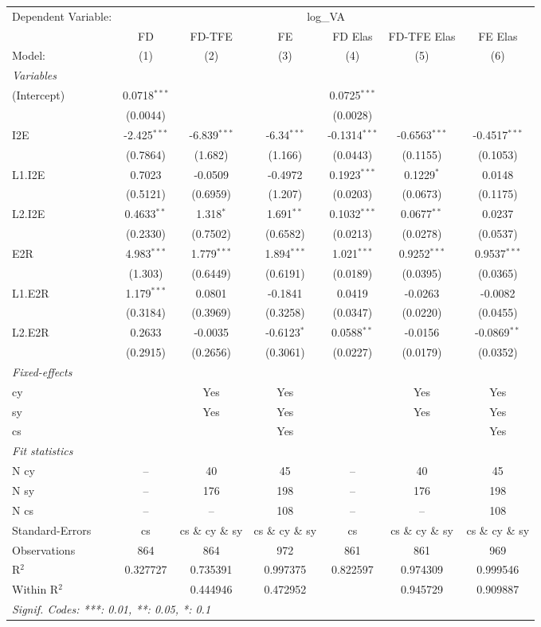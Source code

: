 \begin{tabular}{lcccccc}
Dependent Variable:&\multicolumn{6}{c}{log\_VA}\\
  & FD & FD-TFE & FE & FD Elas & FD-TFE Elas & FE Elas\\
Model:&(1) & (2) & (3) & (4) & (5) & (6)\\
\midrule \emph{Variables}&   &   &   &   &   &  \\
(Intercept)&0.0718$^{***}$ &    &    & 0.0725$^{***}$ &    &   \\
  &(0.0044) &    &    & (0.0028) &    &   \\
I2E&-2.425$^{***}$ & -6.839$^{***}$ & -6.34$^{***}$ & -0.1314$^{***}$ & -0.6563$^{***}$ & -0.4517$^{***}$\\
  &(0.7864) & (1.682) & (1.166) & (0.0443) & (0.1155) & (0.1053)\\
L1.I2E&0.7023 & -0.0509 & -0.4972 & 0.1923$^{***}$ & 0.1229$^{*}$ & 0.0148\\
  &(0.5121) & (0.6959) & (1.207) & (0.0203) & (0.0673) & (0.1175)\\
L2.I2E&0.4633$^{**}$ & 1.318$^{*}$ & 1.691$^{**}$ & 0.1032$^{***}$ & 0.0677$^{**}$ & 0.0237\\
  &(0.2330) & (0.7502) & (0.6582) & (0.0213) & (0.0278) & (0.0537)\\
E2R&4.983$^{***}$ & 1.779$^{***}$ & 1.894$^{***}$ & 1.021$^{***}$ & 0.9252$^{***}$ & 0.9537$^{***}$\\
  &(1.303) & (0.6449) & (0.6191) & (0.0189) & (0.0395) & (0.0365)\\
L1.E2R&1.179$^{***}$ & 0.0801 & -0.1841 & 0.0419 & -0.0263 & -0.0082\\
  &(0.3184) & (0.3969) & (0.3258) & (0.0347) & (0.0220) & (0.0455)\\
L2.E2R&0.2633 & -0.0035 & -0.6123$^{*}$ & 0.0588$^{**}$ & -0.0156 & -0.0869$^{**}$\\
  &(0.2915) & (0.2656) & (0.3061) & (0.0227) & (0.0179) & (0.0352)\\
\midrule \emph{Fixed-effects}&   &   &   &   &   &  \\
cy &  & Yes & Yes &  & Yes & Yes\\
sy &  & Yes & Yes &  & Yes & Yes\\
cs &  &  & Yes &  &  & Yes\\
\midrule \emph{Fit statistics}&  & & & & & \\
N cy & -- & 40 & 45 & -- & 40 & 45\\
N sy & -- & 176 & 198 & -- & 176 & 198\\
N cs & -- & -- & 108 & -- & -- & 108\\
Standard-Errors& cs&cs \& cy \& sy&cs \& cy \& sy&cs&cs \& cy \& sy&cs \& cy \& sy\\
Observations & 864&864&972&861&861&969\\
R$^2$ & 0.327727&0.735391&0.997375&0.822597&0.974309&0.999546\\
Within R$^2$ & &0.444946&0.472952&&0.945729&0.909887\\
\multicolumn{7}{l}{\emph{Signif. Codes: ***: 0.01, **: 0.05, *: 0.1}}\\
\end{tabular}


